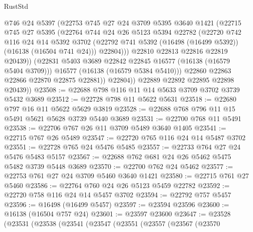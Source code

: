 \begin{lexlean}{RustStd}
\begin{coremodule}
                    @746
                    @24
                    @5397
                    (@22753
                      @745
                      @27
                      @24
                      @3709
                      @5395
                      @3640
                      @1421
                      (@22715
                        @745
                        @27
                        @5395
                        (@22764
                          @744
                          @24
                          @26
                          @5123
                          @5394
                          @22782
                          (@22720
                            @742
                            @116
                            @24
                            @14
                            @5392
                            @3702
                            (@22792 @741 @5392 (@16498 (@16499 @5392)) (@16138 (@16504 @741 @24)))
                            @22804)))
                      @22810
                      @22813
                      @22816
                      @22819
                      @20439))
                  (@22831 @5403 @3689 @22842 @22845 @16577 (@16138 (@16579 @5404 @3709)))
                  @16577
                  (@16138 (@16579 @5384 @5410)))
                @22860
                @22863
                @22866
                @22870
                @22875
                @22881))
            @22804))
        @22889
        @22892
        @22895
        @22898
        @20439))
@23508 := @22688 @798 @116 @11 @14 @5633 @3709 @3702 @3739 @5432 @3689
@23512 := @22728 @798 @11 @5622 @5631
@23518 := @22680 @797 @16 @11 @5622 @5629 @3819
@23528 := @22688 @768 @796 @11 @15 @5491 @5621 @5628 @3739 @5440 @3689
@23531 := @22700 @768 @11 @5491
@23538 := @22706 @767 @26 @11 @3709 @5489 @3640 @1405
@23541 := @22715 @767 @26 @5489
@23547 := @22720 @765 @116 @24 @14 @5487 @3702
@23551 := @22728 @765 @24 @5476 @5485
@23557 := @22733 @764 @27 @24 @5476 @5483 @5157
@23567 := @22688 @762 @681 @24 @26 @5462 @5475 @5482 @3739 @5448 @3689
@23570 := @22700 @762 @24 @5462
@23577 := @22753 @761 @27 @24 @3709 @5460 @3640 @1421
@23580 := @22715 @761 @27 @5460
@23586 := @22764 @760 @24 @26 @5123 @5459 @22782
@23592 := @22720 @758 @116 @24 @14 @5457 @3702
@23594 := @22792 @757 @5457
@23596 := @16498 (@16499 @5457)
@23597 := @23594 @23596
@23600 := @16138 (@16504 @757 @24)
@23601 := @23597 @23600
@23647 := @23528
    (@23531
      (@23538
        (@23541
          (@23547
            (@23551
              (@23557
                (@23567
                  (@23570

\end{coremodule}
\end{lexlean}
